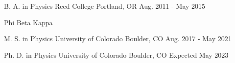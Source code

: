 

\begin{cventries}
  \cventry
    {B. A. in Physics} %
    {Reed College} %
    {Portland, OR} %
    {Aug. 2011 - May 2015} %
    {\begin{cvitems}
    \item {Phi Beta Kappa}
    \end{cvitems}
    }

  \cventry
  {M. S. in Physics}
  {University of Colorado}
  {Boulder, CO}
  {Aug. 2017 - May 2021}
  {}

  \cventry
  {Ph. D. in Physics}
  {University of Colorado}
  {Boulder, CO}
  {Expected May 2023}
  {}

\end{cventries}
